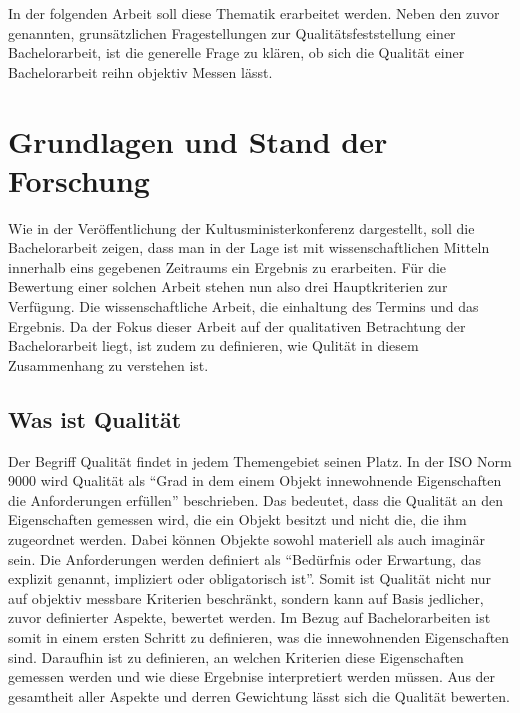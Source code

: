 In der folgenden Arbeit soll diese Thematik erarbeitet werden. Neben den zuvor genannten, grunsätzlichen Fragestellungen zur Qualitätsfeststellung einer Bachelorarbeit, ist die generelle Frage zu klären, ob sich die Qualität einer Bachelorarbeit reihn objektiv Messen lässt. 


\section{Grundlagen und Stand der Forschung}
Wie in der Veröffentlichung der Kultusministerkonferenz dargestellt, soll die Bachelorarbeit zeigen, dass man in der Lage ist mit wissenschaftlichen Mitteln innerhalb eins gegebenen Zeitraums ein Ergebnis zu erarbeiten. Für die Bewertung einer solchen Arbeit stehen nun also drei Hauptkriterien zur Verfügung. Die wissenschaftliche Arbeit, die einhaltung des Termins und das Ergebnis. Da der Fokus dieser Arbeit auf der qualitativen Betrachtung der Bachelorarbeit liegt, ist zudem zu definieren, wie Qulität in diesem Zusammenhang zu verstehen ist.
\subsection{Was ist Qualität}
Der Begriff Qualität findet in jedem Themengebiet seinen Platz. In der \ac{ISO} Norm 9000 wird Qualität als \enquote{Grad in dem einem Objekt innewohnende Eigenschaften die Anforderungen erfüllen}\cite[Vgl.][Kapitel 3.6.2]{iso9000:2015} beschrieben. Das bedeutet, dass die Qualität an den Eigenschaften gemessen wird, die ein Objekt besitzt und nicht die, die ihm zugeordnet werden. Dabei können Objekte sowohl materiell als auch imaginär sein. Die Anforderungen werden definiert als \enquote{Bedürfnis oder Erwartung, das explizit genannt, impliziert oder obligatorisch ist}\cite[Vgl.][Kapitel 3.6.4]{iso9000:2015}. Somit ist Qualität nicht nur auf objektiv messbare Kriterien beschränkt, sondern kann auf Basis jedlicher, zuvor definierter Aspekte, bewertet werden. Im Bezug auf Bachelorarbeiten ist somit in einem ersten Schritt zu definieren, was die innewohnenden Eigenschaften sind. Daraufhin ist zu definieren, an welchen Kriterien diese Eigenschaften gemessen werden und wie diese Ergebnise interpretiert werden müssen. Aus der gesamtheit aller Aspekte und derren Gewichtung lässt sich die Qualität bewerten.

